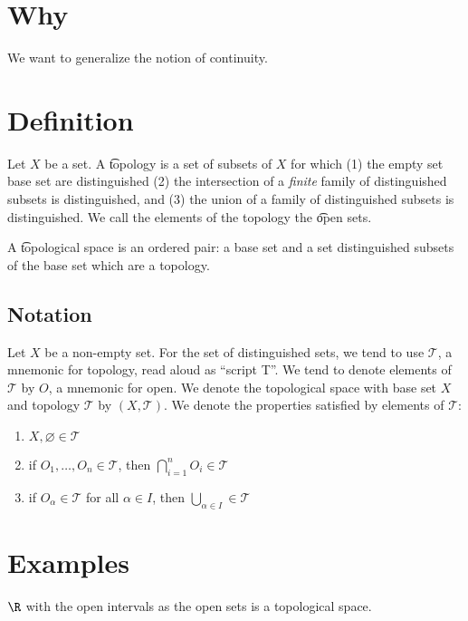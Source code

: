 
\section*{Why}

We want to generalize the notion of continuity.

\section*{Definition}

Let $X$ be a set.
A \t{topology} is a set of subsets of $X$ for which (1) the empty set base set are distinguished (2) the intersection of a \textit{finite} family of distinguished subsets is distinguished, and (3) the union of a family of distinguished subsets is distinguished.
We call the elements of the topology the \t{open sets}.

A \t{topological space} is an ordered pair: a base set and a set distinguished subsets of the base set which are a topology.

\subsection*{Notation}

Let $X$ be a non-empty set.
For the set of distinguished sets, we tend to use $\mathcal{T} $, a mnemonic for topology, read aloud as ``script T''.
We tend to denote elements of $\mathcal{T} $ by $O$, a mnemonic for open.
We denote the topological space with base set $X$ and topology $\mathcal{T} $ by $(X, \mathcal{T} )$.
We denote the properties satisfied by elements of $\mathcal{T} $:
    \begin{enumerate}
      \item $X, \varnothing \in \mathcal{T} $
      \item if $O_1, \dots , O_n \in \mathcal{T} $, then $\bigcap_{i = 1}^{n} O_i \in \mathcal{T} $
      \item if $O_\alpha  \in \mathcal{T} $ for all $\alpha  \in I$, then $\bigcup_{\alpha  \in I} \in \mathcal{T} $
    \end{enumerate}

\section*{Examples}

$\R $ with the open intervals as the open sets is a topological space.
